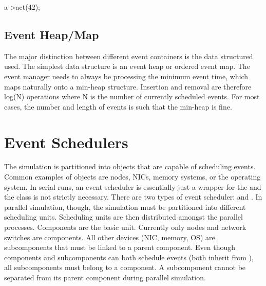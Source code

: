 \begin{CppCode}
a->act(42);
\end{CppCode}


\subsection{Event Heap/Map}
\label{subsec:eventHeap}
The major distinction between different event containers is the data structured used.
The simplest data structure is an event heap or ordered event map.
The event manager needs to always be processing the minimum event time, which maps naturally onto a min-heap structure.
Insertion and removal are therefore log(N) operations where N is the number of currently scheduled events.
For most cases, the number and length of events is such that the min-heap is fine.

\section{Event Schedulers}
\label{sec:eventSchedulers}
The simulation is partitioned into objects that are capable of scheduling events.
Common examples of \evscheduler objects are nodes, NICs, memory systems, or the operating system.
In serial runs, an event scheduler is essentially just a wrapper for the \evmgr and the class is not strictly necessary.
There are two types of event scheduler:  and .
In parallel simulation, though, the simulation must be partitioned into different scheduling units.
Scheduling units are then distributed amongst the parallel processes.
Components are the basic unit.  Currently only nodes and network switches are components.
All other devices (NIC, memory, OS) are subcomponents that must be linked to a parent component.
Even though components and subcomponents can both schedule events (both inherit from \evscheduler),
all subcomponents must belong to a component.  A subcomponent cannot be separated from its parent component during parallel simulation.



